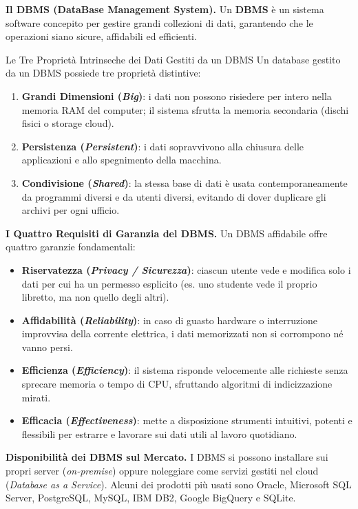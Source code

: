 \documentclass[12pt]{extarticle}
\begin{document}
\medskip
\noindent \textbf{Il DBMS (DataBase Management System).} Un \textbf{DBMS} è un sistema software concepito per gestire grandi collezioni di dati, garantendo che le operazioni siano sicure, affidabili ed efficienti.

\begin{cbox}{Le Tre Proprietà Intrinseche dei Dati Gestiti da un DBMS}
\noindent Un database gestito da un DBMS possiede tre proprietà distintive:
\begin{enumerate}
    \item \textbf{Grandi Dimensioni (\textit{Big})}: i dati non possono risiedere per intero nella memoria RAM del computer; il sistema sfrutta la memoria secondaria (dischi fisici o storage cloud).
    \item \textbf{Persistenza (\textit{Persistent})}: i dati sopravvivono alla chiusura delle applicazioni e allo spegnimento della macchina.
    \item \textbf{Condivisione (\textit{Shared})}: la stessa base di dati è usata contemporaneamente da programmi diversi e da utenti diversi, evitando di dover duplicare gli archivi per ogni ufficio.
\end{enumerate}
\end{cbox}

\medskip
\noindent \textbf{I Quattro Requisiti di Garanzia del DBMS.} Un DBMS affidabile offre quattro garanzie fondamentali:
\begin{itemize}
    \item \textbf{Riservatezza (\textit{Privacy / Sicurezza})}: ciascun utente vede e modifica solo i dati per cui ha un permesso esplicito (es. uno studente vede il proprio libretto, ma non quello degli altri).
    \item \textbf{Affidabilità (\textit{Reliability})}: in caso di guasto hardware o interruzione improvvisa della corrente elettrica, i dati memorizzati non si corrompono né vanno persi.
    \item \textbf{Efficienza (\textit{Efficiency})}: il sistema risponde velocemente alle richieste senza sprecare memoria o tempo di CPU, sfruttando algoritmi di indicizzazione mirati.
    \item \textbf{Efficacia (\textit{Effectiveness})}: mette a disposizione strumenti intuitivi, potenti e flessibili per estrarre e lavorare sui dati utili al lavoro quotidiano.
\end{itemize}

\medskip
\noindent \textbf{Disponibilità dei DBMS sul Mercato.} I DBMS si possono installare sui propri server (\textit{on-premise}) oppure noleggiare come servizi gestiti nel cloud (\textit{Database as a Service}). Alcuni dei prodotti più usati sono Oracle, Microsoft SQL Server, PostgreSQL, MySQL, IBM DB2, Google BigQuery e SQLite.
\end{document}
